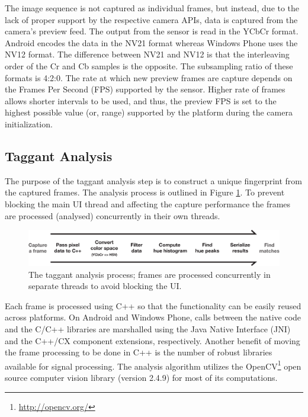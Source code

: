 \documentclass[thesis.tex]{subfiles}
\begin{document}
The image sequence is not captured as individual frames, but instead, due to the lack of proper support by the respective camera APIs, data is captured from the camera's preview feed. The output from the sensor is read in the YCbCr format. Android encodes the data in the NV21 format whereas Windows Phone uses the NV12 format. The difference between NV21 and NV12 is that the interleaving order of the Cr and Cb samples is the opposite. The subsampling ratio of these formats is 4:2:0. The rate at which new preview frames are capture depends on the Frames Per Second (FPS) supported by the sensor. Higher rate of frames allows shorter intervals to be used, and thus, the preview FPS is set to the highest possible value (or, range) supported by the platform during the camera initialization.

\subsection{Taggant Analysis}

The purpose of the taggant analysis step is to construct a unique fingerprint from the captured frames. The analysis process is outlined in Figure \ref{figure:taggant-analysis-process}. To prevent blocking the main UI thread and affecting the capture performance the frames are processed (analysed) concurrently in their own threads.

\begin{figure}[h]
\centering \includegraphics[width=\textwidth,height=\textheight,keepaspectratio=true]{images/design_implementation/analysis_process.pdf}
\caption{The taggant analysis process; frames are processed concurrently in separate threads to avoid blocking the UI.\label{figure:taggant-analysis-process}}
\end{figure}

Each frame is processed using C++ so that the functionality can be easily reused across platforms. On Android and Windows Phone, calls between the native code and the C/C++ libraries are marshalled using the Java Native Interface (JNI) and the C++/CX component extensions, respectively. Another benefit of moving the frame processing to be done in C++ is the number of robust libraries available for signal processing. The analysis algorithm utilizes the OpenCV\footnote{\url{http://opencv.org/}} open source computer vision library (version 2.4.9) for most of its computations.
\end{document}
